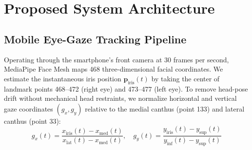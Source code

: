 \documentclass[conference]{IEEEtran}
\begin{document}
\begin{table}[t]
\centering
\caption{Comparison with State-of-the-Art Dyslexia Screening}
\label{tab:lit_comparison}
\end{table}

\section{Proposed System Architecture}
\subsection{Mobile Eye-Gaze Tracking Pipeline}
Operating through the smartphone's front camera at 30 frames per second, MediaPipe Face Mesh maps 468 three-dimensional facial coordinates. We estimate the instantaneous iris position $\mathbf{p}_{\text{iris}}(t)$ by taking the center of landmark points 468--472 (right eye) and 473--477 (left eye). To remove head-pose drift without mechanical head restraints, we normalize horizontal and vertical gaze coordinates $(g_x, g_y)$ relative to the medial canthus (point 133) and lateral canthus (point 33):
\begin{equation}
g_x(t) = \frac{x_{\text{iris}}(t) - x_{\text{med}}(t)}{x_{\text{lat}}(t) - x_{\text{med}}(t)}, \quad g_y(t) = \frac{y_{\text{iris}}(t) - y_{\text{sup}}(t)}{y_{\text{inf}}(t) - y_{\text{sup}}(t)}
\end{equation}
\end{document}
